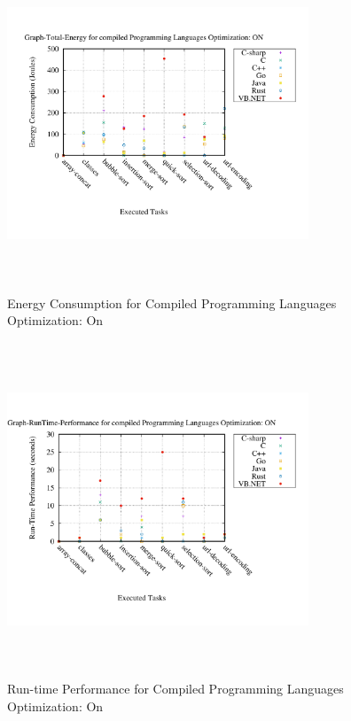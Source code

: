 \begin{figure}
	\centering
	\includegraphics[width=9cm,height=10cm,keepaspectratio]{"Graph_Graph-Total-Energy_compiled_Optimization_On"}
	\caption{ Energy Consumption for Compiled Programming Languages Optimization: On}
	\label{Compiled with Optimization Total}
\end{figure}

\begin{figure}
	\centering
	\includegraphics[width=9cm,height=10cm,keepaspectratio]{"Graph_Graph-RunTime-Performance_compiled_Optimization_On"}
	\caption{Run-time Performance for Compiled Programming Languages Optimization: On}
	\label{Performance Compiled with Optimization Total}
\end{figure}

